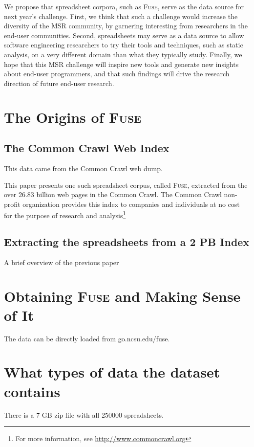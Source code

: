 \documentclass[conference]{IEEEtran}
\begin{document}
We propose that spreadsheet corpora, such as \textsc{Fuse}, serve as the data source for next year's challenge. First, we think that such a challenge would increase the diversity of the MSR community, by garnering interesting from researchers in the end-user communities. Second, spreadsheets may serve as a data source to allow software engineering researchers to try their tools and techniques, such as static analysis, on a very different domain than what they typically study. Finally, we hope that this MSR challenge will inspire new tools and generate new insights about end-user programmers, and that such findings will drive the research direction of future end-user research.

\section{The Origins of \textsc{Fuse}}

\subsection{The Common Crawl Web Index}

This data came from the Common Crawl web dump.

This paper presents one such spreadsheet corpus, called \textsc{Fuse}, extracted from the over 26.83 billion web pages in the Common Crawl. 
The Common Crawl non-profit organization provides this index to companies and individuals at no cost for the purpose of research and analysis\footnote{For more information, see \url{http://www.commoncrawl.org}}

\subsection{Extracting the spreadsheets from a 2 PB Index}

A brief overview of the previous paper


\section{Obtaining \textsc{Fuse} and Making Sense of It}

The data can be directly loaded from go.ncsu.edu/fuse.
\section{What types of data the dataset contains}
There is a 7 GB zip file with all 250000 spreadsheets.
\end{document}
